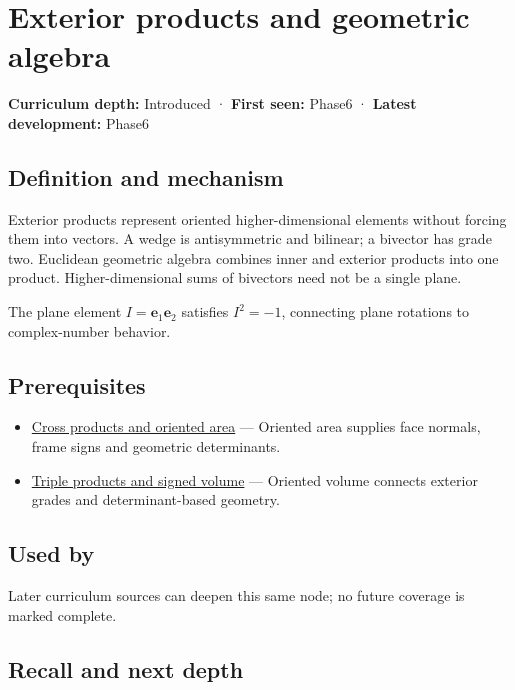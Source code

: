 \hypertarget{appendix-e1960925d1b8}{}
\section{Exterior products and geometric algebra}\label{appendix-e1960925d1b8-exterior-products-and-geometric-algebra}

\textbf{Curriculum depth:} Introduced · \textbf{First seen:} Phase6 · \textbf{Latest development:} Phase6

\subsection{Definition and mechanism}\label{appendix-e1960925d1b8-definition-and-mechanism}

Exterior products represent oriented higher-dimensional elements without forcing them into vectors. A wedge is antisymmetric and bilinear; a bivector has grade two. Euclidean geometric algebra combines inner and exterior products into one product. Higher-dimensional sums of bivectors need not be a single plane.

The plane element \(I=\mathbf e_1\mathbf e_2\) satisfies \(I^2=-1\), connecting plane rotations to complex-number behavior.

\subsection{Prerequisites}\label{appendix-e1960925d1b8-prerequisites}

\begin{itemize}
\tightlist
\item
  \hyperref[appendix-2391db8052b1]{Cross products and oriented area} --- Oriented area supplies face normals, frame signs and geometric determinants.
\item
  \hyperref[appendix-5caa058bd9c7]{Triple products and signed volume} --- Oriented volume connects exterior grades and determinant-based geometry.
\end{itemize}

\subsection{Used by}\label{appendix-e1960925d1b8-used-by}

Later curriculum sources can deepen this same node; no future coverage is marked complete.

\subsection{Recall and next depth}\label{appendix-e1960925d1b8-recall-and-next-depth}

